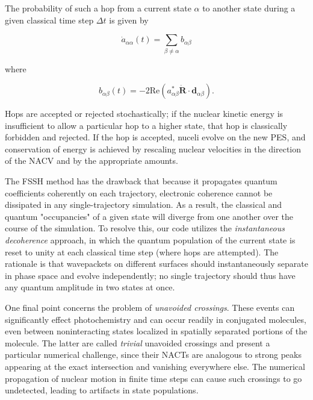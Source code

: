 \documentclass[12pt,letter,footinclude=true,headinclude=true,hyphens]{book} %
\begin{document}
    The probability of such a hop from a current state $\alpha$ to another state during a given classical time step $\Delta t$ is given by
    
    \begin{equation}
    \dot{a}_{\alpha \alpha}(t) = \sum_{\beta \neq \alpha} b_{\alpha \beta}
    \end{equation}
    
    where 
    
    \begin{equation}
    b_{\alpha \beta}(t) = -2 \textrm{Re} \left ( a_{\alpha \beta}^* \dot{\mathbf{R}} \cdot \mathbf{d}_{\alpha \beta} \right ). 
    \end{equation}
    
    Hops are accepted or rejected stochastically; if the nuclear kinetic energy is insufficient to allow a particular hop to a higher state, that hop is classically forbidden and rejected. If the hop is accepted, nuceli evolve on the new PES, and conservation of energy is achieved by rescaling nuclear velocities in the direction of the NACV and by the appropriate amounts.
    
    The FSSH method has the drawback that because it propagates quantum coefficients coherently on each trajectory, electronic coherence cannot be dissipated in any single-trajectory simulation. As a result, the classical and quantum "occupancies" of a given state will diverge from one another over the course of the simulation. To resolve this, our code utilizes the \emph{instantaneous decoherence} approach, in which the quantum population of the current state is reset to unity at each classical time step (where hops are attempted). The rationale is that wavepackets on different surfaces should instantaneously separate in phase space and evolve independently; no single trajectory should thus have any quantum amplitude in two states at once.
    
    One final point concerns the problem of \emph{unavoided crossings}. These events can significantly effect photochemistry and can occur readily in conjugated molecules, even between noninteracting states localized in spatially separated portions of the molecule. The latter are called \emph{trivial} unavoided crossings and present a particular numerical challenge, since their NACTs are analogous to strong peaks appearing at the exact intersection and vanishing everywhere else. The numerical propagation of nuclear motion in finite time steps can cause such crossings to go undetected, leading to artifacts in state populations.
    
\end{document}
